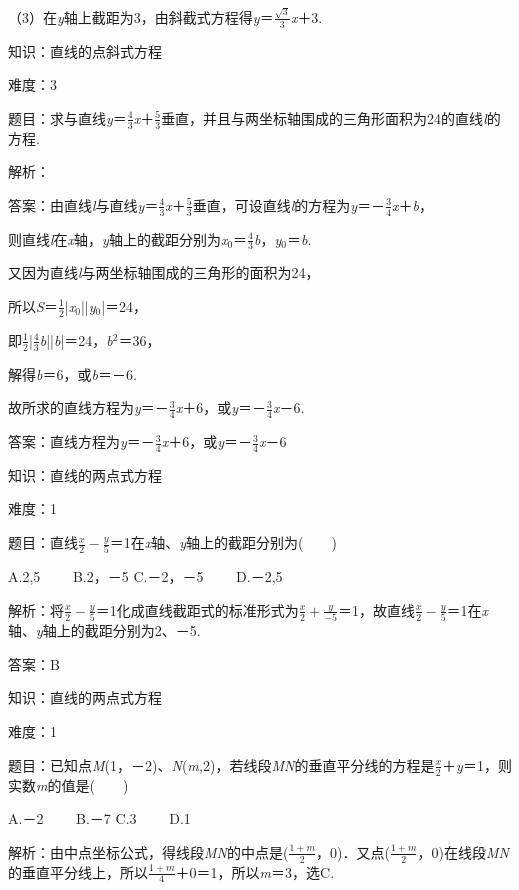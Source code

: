 \documentclass{article} %
\begin{document}
（3）在\textit{y}轴上截距为3，由斜截式方程得\textit{y}＝$\frac{\sqrt{3}}{3}$\textit{x}＋3.


知识：直线的点斜式方程

难度：3

题目：求与直线\textit{y}＝$\frac{4}{3}$\textit{x}＋$\frac{5}{3}$垂直，并且与两坐标轴围成的三角形面积为24的直线\textit{l}的方程.

解析：

答案：由直线\textit{l}与直线\textit{y}＝$\frac{4}{3}$\textit{x}＋$\frac{5}{3}$垂直，可设直线\textit{l}的方程为\textit{y}＝－$\frac{3}{4}$\textit{x}＋\textit{b}，

则直线\textit{l}在\textit{x}轴，\textit{y}轴上的截距分别为\textit{x}${}_{0}$＝$\frac{4}{3}$\textit{b}，\textit{y}${}_{0}$＝\textit{b}.

又因为直线\textit{l}与两坐标轴围成的三角形的面积为24，

所以\textit{S}＝$\frac{1}{2}$|\textit{x}${}_{0}$||\textit{y}${}_{0}$|＝24，

即$\frac{1}{2}$|$\frac{4}{3}$\textit{b}||\textit{b}|＝24，\textit{b}${}^{2}$＝36，

解得\textit{b}＝6，或\textit{b}＝－6.

故所求的直线方程为\textit{y}＝－$\frac{3}{4}$\textit{x}＋6，或\textit{y}＝－$\frac{3}{4}$\textit{x}－6.

答案：直线方程为\textit{y}＝－$\frac{3}{4}$\textit{x}＋6，或\textit{y}＝－$\frac{3}{4}$\textit{x}－6

知识：直线的两点式方程

难度：1

题目：直线$\frac{x}{2}-\frac{y}{5}$＝1在\textit{x}轴、\textit{y}轴上的截距分别为(　　)

A.2,5　　 B.2，－5 C.－2，－5　　 D.－2,5

解析：将$\frac{x}{2}-\frac{y}{5}$＝1化成直线截距式的标准形式为$\frac{x}{2}+\frac{y}{-5}$＝1，故直线$\frac{x}{2}-\frac{y}{5}$＝1在\textit{x}轴、\textit{y}轴上的截距分别为2、－5.

答案：B

知识：直线的两点式方程

难度：1

题目：已知点\textit{M}(1，－2)、\textit{N}(\textit{m,}2)，若线段\textit{MN}的垂直平分线的方程是$\frac{x}{2}$＋\textit{y}＝1，则实数\textit{m}的值是(　　)

A.－2　　 B.－7 C.3　　 D.1

解析：由中点坐标公式，得线段\textit{MN}的中点是($\frac{1+m}{2}$，0)．又点($\frac{1+m}{2}$，0)在线段\textit{MN}的垂直平分线上，所以$\frac{1+m}{4}$＋0＝1，所以\textit{m}＝3，选C.
\end{document}
